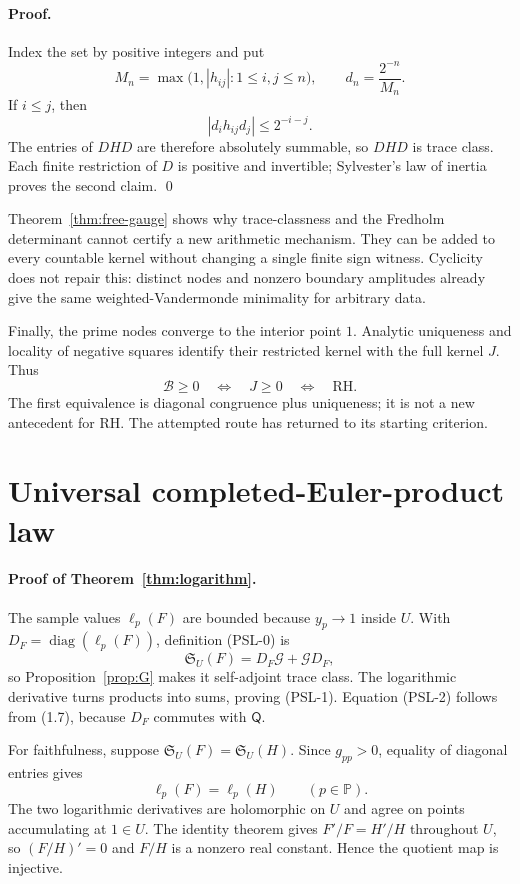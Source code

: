 \documentclass[11pt]{article}
\theoremstyle{definition}
\theoremstyle{remark}
\newcommand{\PP}{\mathbb P}
\newcommand{\cB}{\mathcal B}
\newcommand{\cG}{\mathcal G}
\newcommand{\diag}{\operatorname{diag}}
\begin{document}
\paragraph{Proof.}
Index the set by positive integers and put
\[
 M_n=\max\bigl(1,|h_{ij}|:1\leq i,j\leq n\bigr),
 \qquad d_n=\frac{2^{-n}}{M_n}.
\]
If $i\leq j$, then
\[
 |d_i h_{ij}d_j|\leq2^{-i-j}.
\]
The entries of $DHD$ are therefore absolutely summable, so $DHD$ is trace class.  Each finite
restriction of $D$ is positive and invertible; Sylvester's law of inertia proves the second
claim. \qed

Theorem~\ref{thm:free-gauge} shows why trace-classness and the Fredholm determinant cannot certify
a new arithmetic mechanism.  They can be added to every countable kernel without changing a
single finite sign witness.  Cyclicity does not repair this: distinct nodes and nonzero boundary
amplitudes already give the same weighted-Vandermonde minimality for arbitrary data.

Finally, the prime nodes converge to the interior point $1$.  Analytic uniqueness and locality of
negative squares identify their restricted kernel with the full kernel $J$.  Thus
\[
 \cB\geq0
 \quad\Longleftrightarrow\quad
 J\geq0
 \quad\Longleftrightarrow\quad
 \mathrm{RH}.
\]
The first equivalence is diagonal congruence plus uniqueness; it is not a new antecedent for RH.
The attempted route has returned to its starting criterion.

\section{Universal completed-Euler-product law}
\label{sec:universal}

\paragraph{Proof of Theorem~\ref{thm:logarithm}.}
The sample values $\ell_p(F)$ are bounded because $y_p\to1$ inside $U$.  With
$D_F=\diag(\ell_p(F))$, definition (PSL-0) is
\begin{equation}
 \mathfrak S_U(F)=D_F\cG+\cG D_F,                          \tag{10.1}
\end{equation}
so Proposition~\ref{prop:G} makes it self-adjoint trace class.  The logarithmic derivative turns
products into sums, proving (PSL-1).  Equation (PSL-2) follows from (1.7), because $D_F$ commutes
with $\mathsf Q$.

For faithfulness, suppose $\mathfrak S_U(F)=\mathfrak S_U(H)$.  Since $g_{pp}>0$, equality of
diagonal entries gives
\[
 \ell_p(F)=\ell_p(H)\qquad(p\in\PP).
\]
The two logarithmic derivatives are holomorphic on $U$ and agree on points accumulating at
$1\in U$.  The identity theorem gives $F'/F=H'/H$ throughout $U$, so $(F/H)'=0$ and $F/H$ is a
nonzero real constant.  Hence the quotient map is injective.
\end{document}
